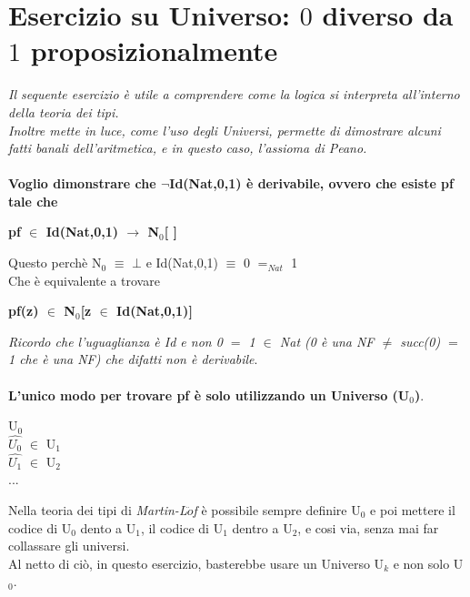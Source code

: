 \section{Esercizio su Universo: $0$ diverso da $1$ proposizionalmente}
\label{sec:esercizio-su-universo}
\textit{Il sequente esercizio \`e utile a comprendere come la logica si interpreta all'interno della teoria dei tipi.\\
Inoltre mette in luce, come l'uso degli Universi, permette di dimostrare alcuni fatti banali dell'aritmetica, e in questo caso, l'assioma di Peano.}\\\\
\noindent
\textbf{Voglio dimonstrare che $\neg$Id(Nat,0,1) \`e derivabile, ovvero che esiste pf tale che} 
\begin{center}\textbf{pf $\in$ Id(Nat,0,1) $\rightarrow$ N$_0$[ ]}\end{center}
Questo perch\`e N$_0$ $\equiv$ $\bot$ e Id(Nat,0,1) $\equiv$ $0$ $=_{Nat}$ 1\\
Che \`e equivalente  a trovare 
\begin{center}\textbf{pf(z) $\in$ N$_0$[z $\in$ Id(Nat,0,1)]}\end{center}
\noindent \textit{Ricordo che l'uguaglianza \`e Id e non 0 $=$ 1 $\in$ Nat (0 \`e una NF $\neq$ succ(0) $=$ 1 che \`e una NF) che difatti non \`e derivabile}.\\\\
\noindent \textbf{L'unico modo per trovare pf \`e solo utilizzando un Universo (U$_0$)}.
\begin{center}
U$_0$\\
$\hat{U_0}$ $\in$ U$_1$\\
$\hat{U_1}$ $\in$ U$_2$\\
...
\end{center}
\noindent
Nella teoria dei tipi di \textit{Martin-L$\ddot{o}$f} \`e possibile sempre definire U$_0$ e poi mettere il codice di U$_0$ dento a U$_1$, il codice di U$_1$ dentro a U$_2$, e cosi via, senza mai far collassare gli universi.\\
Al netto di ci\`o, in questo esercizio, basterebbe usare un Universo U$_k$ e non solo U$_0$.

